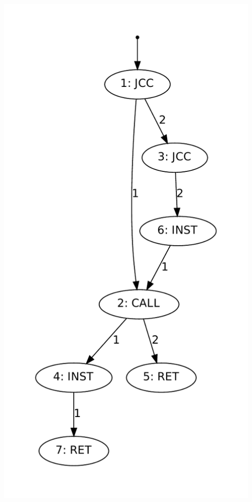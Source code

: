 \begin{center}
\includegraphics[height=0.4\textheight]{supports/algos/images/g1larg.pdf}
\end{center}

